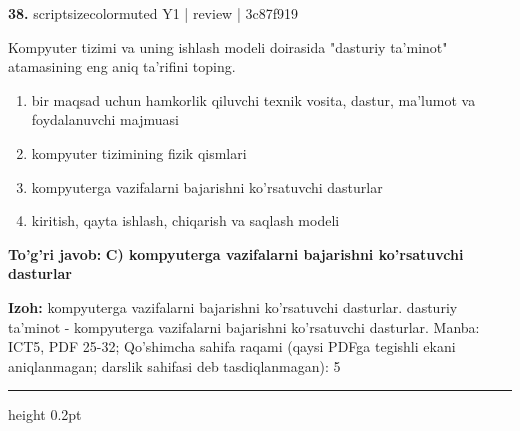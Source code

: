 \documentclass[10pt,a4paper]{article}
\begin{document}
{\bfseries\sffamily\color{ink} 38.} {scriptsizecolor{muted} Y1 | review | 3c87f919}
\par
Kompyuter tizimi va uning ishlash modeli doirasida "dasturiy ta'minot" atamasining eng aniq ta'rifini toping.
\begin{enumerate}[label=\Alph*),leftmargin=9mm]
\item bir maqsad uchun hamkorlik qiluvchi texnik vosita, dastur, ma'lumot va foydalanuvchi majmuasi
\item kompyuter tizimining fizik qismlari
\item kompyuterga vazifalarni bajarishni ko'rsatuvchi dasturlar
\item kiritish, qayta ishlash, chiqarish va saqlash modeli
\end{enumerate}
\begin{tcolorbox}[enhanced,breakable,colback=teal!4,colframe=teal!60!black,boxrule=0.45pt,arc=1.2mm,left=2.7mm,right=2.7mm,top=1.8mm,bottom=1.8mm,before skip=2mm,after skip=2mm]
{\bfseries\sffamily\color{teal}To'g'ri javob:} \textbf{C) kompyuterga vazifalarni bajarishni ko'rsatuvchi dasturlar}
\par\smallskip
{\bfseries Izoh:} kompyuterga vazifalarni bajarishni ko'rsatuvchi dasturlar. dasturiy ta'minot - kompyuterga vazifalarni bajarishni ko'rsatuvchi dasturlar. Manba: ICT5, PDF 25-32; Qo'shimcha sahifa raqami (qaysi PDFga tegishli ekani aniqlanmagan; darslik sahifasi deb tasdiqlanmagan): 5
\end{tcolorbox}
\vspace{2mm}\hrule height 0.2pt\vspace{3mm}
\end{document}

